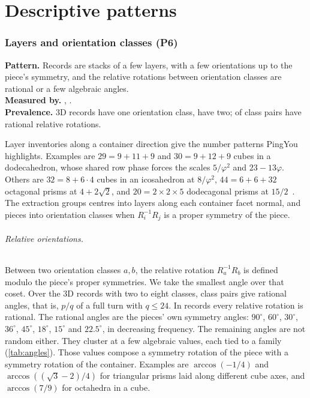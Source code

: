 \documentclass[11pt,a4paper]{article}
\begin{document}
\clearpage
\part{Descriptive patterns}\label{part:desc}

\section{Layers and orientation classes (P6)}\label{sec:layers}

\begin{summarybox}
\textbf{Pattern.} Records are stacks of a few layers, with a few orientations up to the piece's symmetry, and the relative rotations between orientation classes are rational or a few algebraic angles.\\
\textbf{Measured by.} , .\\
\textbf{Prevalence.} \nOneOrient{} 3D records have one orientation class, \nTwoOrient{} have two; \nRotRational{} of \nRotPairs{} class pairs have rational relative rotations.
\end{summarybox}

Layer inventories along a container direction give the number patterns PingYou highlights. Examples are $29=9+11+9$ and $30=9+12+9$ cubes in a dodecahedron, whose shared row phase forces the scales $5/\varphi^2$ and $23-13\varphi$. Others are $32=8+6\cdot4$ cubes in an icosahedron at $8/\varphi^2$, $44=6+6+32$ octagonal prisms at $4+2\sqrt2$, and $20=2\times2\times5$ dodecagonal prisms at $15/2$~\cite{pingSixteen}. The extraction groups centres into layers along each container facet normal, and pieces into orientation classes when $R_i^{-1}R_j$ is a proper symmetry of the piece.

\paragraph{Relative orientations.} Between two orientation classes $a,b$, the relative rotation $R_a^{-1}R_b$ is defined modulo the piece's proper symmetries. We take the smallest angle over that coset. Over the \nRotRecords{} 3D records with two to eight classes, \nRotPairs{} class pairs give \nRotRational{} rational angles, that is, $p/q$ of a full turn with $q\le24$. In \nRotAllRational{} records every relative rotation is rational. The rational angles are the pieces' own symmetry angles: $90^\circ$, $60^\circ$, $30^\circ$, $36^\circ$, $45^\circ$, $18^\circ$, $15^\circ$ and $22.5^\circ$, in decreasing frequency. The remaining angles are not random either. They cluster at a few algebraic values, each tied to a family (\cref{tab:angles}). Those values compose a symmetry rotation of the piece with a symmetry rotation of the container. Examples are $\arccos(-1/4)$ and $\arccos((\sqrt3-2)/4)$ for triangular prisms laid along different cube axes, and $\arccos(7/9)$ for octahedra in a cube.
\end{document}
